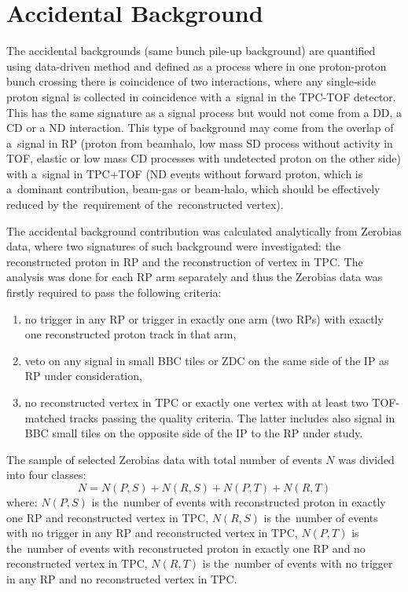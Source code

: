 \section{Accidental Background}\label{section:star_accidentals}
The accidental backgrounds (same bunch pile-up background) are quantified using data-driven method and defined as a process where in one proton-proton bunch crossing there is coincidence of two interactions, where any single-side proton signal is collected in coincidence with a~signal in the TPC-TOF detector. This has the same signature as a signal process but would not come from a DD, a CD or a ND interaction. This type of background may come from the overlap of a~signal in \ac{RP} (proton from beamhalo, low mass SD process without activity in TOF, elastic or low mass CD processes with undetected proton on the other side) with a~signal in TPC+TOF (ND events without forward proton, which is a~dominant contribution, beam-gas or beam-halo, which  should be effectively reduced by the~requirement of the~reconstructed vertex).

The accidental background contribution was calculated analytically from Zerobias data, where two signatures of such background were investigated: the reconstructed proton in RP and the reconstruction of vertex in TPC. The analysis was done for each RP arm separately and thus the 
 Zerobias data was firstly required to pass the following criteria:
\begin{enumerate}
	\item no trigger in any RP or trigger in exactly one arm (two RPs) with exactly one reconstructed proton track in that arm,
	\item veto on any signal in small BBC tiles or ZDC on the same  side of the IP as  RP under consideration,
	\item no reconstructed vertex in TPC or exactly one vertex with at least two TOF-matched tracks passing the quality criteria. The latter includes also signal in BBC small tiles on the opposite side of the IP to the RP under study. 
\end{enumerate}
 The sample of selected Zerobias data with total  number  of events $N$ was divided into four classes:
\begin{equation}
N=N(P,S)+N(R,S)+N(P,T)+N(R,T)
\label{eq:accidentalSTAR_N}
\end{equation}
where: $N(P,S)$ is the~number of events with reconstructed proton in exactly one RP and reconstructed vertex in TPC, $N(R,S)$  is the~number of events with no trigger in any RP and reconstructed vertex in TPC, $N(P,T)$ is the~number of events with reconstructed proton in exactly one RP and no reconstructed vertex in TPC, $N(R,T)$ is the~number of events with no trigger in any RP and no reconstructed vertex in TPC.\\

